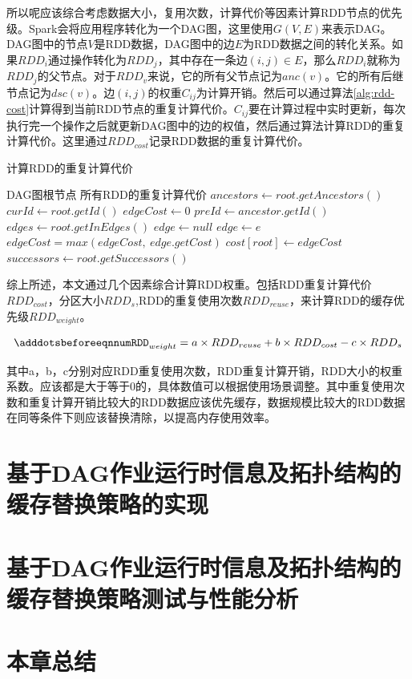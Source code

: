 所以呢应该综合考虑数据大小，复用次数，计算代价等因素计算RDD节点的优先级。Spark会将应用程序转化为一个DAG图，这里使用$G(V, E)$来表示DAG。DAG图中的节点$V$是RDD数据，DAG图中的边$E$为RDD数据之间的转化关系。如果$RDD_i$通过操作转化为$RDD_j$，其中存在一条边$(i, j)\in E$，那么$RDD_i$就称为$RDD_j$的父节点。对于$RDD_v$来说，它的所有父节点记为$anc(v)$。它的所有后继节点记为$dsc(v)$。边$(i,j)$的权重$C_{ij}$为计算开销。然后可以通过算法\ref{alg:rdd-cost}计算得到当前RDD节点的重复计算代价。$C_{ij}$要在计算过程中实时更新，每次执行完一个操作之后就更新DAG图中的边的权值，然后通过算法计算RDD的重复计算代价。这里通过$RDD_{cost}$记录RDD数据的重复计算代价。

\begin{algorithm}  
    \caption{计算RDD的重复计算代价}  
    \begin{algorithmic}[1] %
        \Require DAG图根节点
        \Ensure 所有RDD的重复计算代价
            \State $ancestors \gets root.getAncestors()$
            \State $curId \gets root.getId()$
            \State $edgeCost \gets 0$
                \State $preId \gets ancestor.getId()$
                \State $edges \gets root.getInEdges()$
                \State $edge \gets null$
                        \State $edge \gets e$
                    \EndIf
                \EndFor
                \State $edgeCost = max(edgeCost, \ edge.getCost)$
            \EndFor
            \State $cost[root] \gets edgeCost$
            \State $successors \gets root.getSuccessors()$
                \State {}
            \EndFor
        \EndFunction
    \end{algorithmic}
    \label{alg:rdd-cost}
\end{algorithm}

综上所述，本文通过几个因素综合计算RDD权重。包括RDD重复计算代价$RDD_{cost}$，分区大小$RDD_s$,RDD的重复使用次数$RDD_{reuse}$，来计算RDD的缓存优先级$RDD_{weight}$。

\begin{equation} \label{eq:weight}
    \adddotsbeforeeqnnum%
    RDD_{weight}=a \times RDD_{reuse} + b \times RDD_{cost} - c \times RDD_{s}
\end{equation}

其中a，b，c分别对应RDD重复使用次数，RDD重复计算开销，RDD大小的权重系数。应该都是大于等于0的，具体数值可以根据使用场景调整。其中重复使用次数和重复计算开销比较大的RDD数据应该优先缓存，数据规模比较大的RDD数据在同等条件下则应该替换清除，以提高内存使用效率。

\section{基于DAG作业运行时信息及拓扑结构的缓存替换策略的实现}
\section{基于DAG作业运行时信息及拓扑结构的缓存替换策略测试与性能分析}
\section{本章总结}
